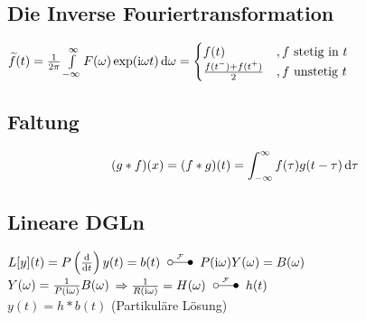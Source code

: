 \documentclass[german,color,5pt]{latex4ei/latex4ei_fs}
\begin{document}
\begin{sectionbox}
	\subsection{Die Inverse Fouriertransformation}
	$\widetilde{f}(t) = \frac{1}{2\pi} \int\limits_{-\infty}^\infty F(\omega) \exp(\i \omega t) \diff \omega = \begin{cases} f(t) &, f \text{ stetig in }t \\ \frac{f(t^-) + f(t^+)}{2} &, f\text{ unstetig }t \end{cases}$
\end{sectionbox}

\begin{sectionbox}
	
	
	\subsection{Faltung}
	\[(g*f)(x)=(f*g)(t)=\int_{-\infty}^{\infty}f(\tau)g(t-\tau)\diff \tau\]
\end{sectionbox}

\begin{sectionbox}
	\subsection{Lineare DGLn}
	$L[y](t) = P\left(\frac{\diff}{\diff t}\right)y(t) = b(t) \FT P(\i \omega)Y(\omega) = B(\omega)$\\
	$Y(\omega) = \frac{1}{P(\mathrm{i} \omega)}B(\omega)$ \qquad  $\Ra\frac{1}{R(\i\omega)} = H(\omega) \FT h(t)$\\
	$y(t) = h*b(t)$ (Partikuläre Lösung)
\end{sectionbox}
\end{document}
